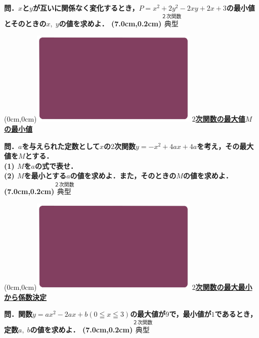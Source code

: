 \documentclass[10pt,
fleqn,
dvipdfmx,
uplatex
]{jsarticle}
\begin{document}
\Large 
\bf\boldmath 問．$x$と$y$が互いに関係なく変化するとき，$P=x^2+2y^2-2xy+2x+3$の最小値とそのときの$x,\;y$の値を求めよ．
\at(7.0cm,0.2cm){\small\color{bradorange}$\overset{\text{２次関数}}{\text{典型}}$}


\newpage



\at(0cm,0cm){\includegraphics[width=8cm,bb=0 0 1920 1080]{./youtube/thumbnails/templates/smart_background/２次関数.jpeg}}
{\color{orange}\bf\boldmath\Large\underline{$2$次関数の最大値$M$の最小値}}\vspace{0.3zw}

\normalsize 
\bf\boldmath 問．$a$を与えられた定数として$x$の$2$次関数$y=-x^2+4ax+4a$を考え，その最大値を$M$とする．\\
(1)  $M$を$a$の式で表せ．\\
(2)  $M$を最小とする$a$の値を求めよ．また，そのときの$M$の値を求めよ．\\

\at(7.0cm,0.2cm){\small\color{bradorange}$\overset{\text{２次関数}}{\text{典型}}$}


\newpage



\at(0cm,0cm){\includegraphics[width=8cm,bb=0 0 1920 1080]{./youtube/thumbnails/templates/smart_background/２次関数.jpeg}}
{\color{orange}\bf\boldmath\Large\underline{$2$次関数の最大最小から係数決定}}\vspace{0.3zw}

\Large 
\bf\boldmath 問．関数$y=ax^2-2ax+b\left(0\leqq x\leqq 3\right)$の最大値が$9$で，最小値が$1$であるとき，定数$a,\;b$の値を求めよ．
\at(7.0cm,0.2cm){\small\color{bradorange}$\overset{\text{２次関数}}{\text{典型}}$}
\end{document}
